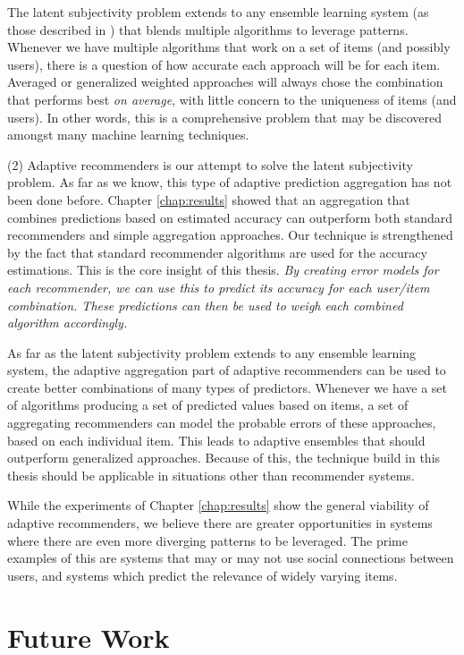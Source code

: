The latent subjectivity problem extends to any ensemble learning system
(as those described in \cite{Polikar2006}) that blends multiple 
algorithms to leverage patterns.
Whenever we have multiple algorithms that work on a set of items
(and possibly users), there is a question of how accurate each
approach will be for each item.
Averaged or generalized weighted approaches will always
chose the combination that performs best \emph{on average},
with little concern to the uniqueness of items (and users).
In other words, this is a comprehensive problem
that may be discovered amongst many machine learning techniques.

(2) Adaptive recommenders is our attempt to solve the latent subjectivity problem.
As far as we know, this type of adaptive prediction aggregation has not been done before.
Chapter \ref{chap:results} showed that an aggregation that combines predictions based
on estimated accuracy can outperform both standard recommenders and simple aggregation approaches.
Our technique is strengthened by the fact that standard recommender algorithms
are used for the accuracy estimations.
This is the core insight of this thesis. 
\emph{By creating error models for each recommender, we can use this to predict
its accuracy for each user/item combination.
These predictions can then be used to weigh each combined algorithm accordingly.}

As far as the latent subjectivity problem extends to any ensemble learning system,
the adaptive aggregation part of adaptive recommenders can be used to 
create better combinations of many types of predictors.
Whenever we have a set of algorithms producing a set of predicted values
based on items, a set of aggregating recommenders can model the probable
errors of these approaches, based on each individual item.
This leads to adaptive ensembles that should outperform generalized approaches.
Because of this, the technique build in this thesis should be 
applicable in situations other than recommender systems.

While the experiments of Chapter \ref{chap:results} show the general viability of adaptive recommenders,
we believe there are greater opportunities in systems where there  are even more diverging
patterns to be leveraged. The prime examples of this are systems that may or may 
not use social connections between users, and systems which predict the 
relevance of widely varying items.


\section{Future Work}      

